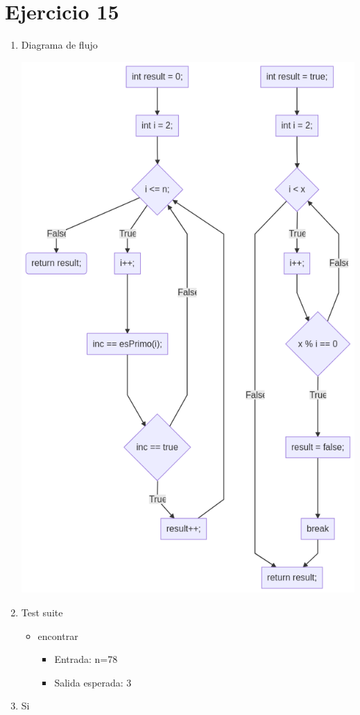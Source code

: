 \documentclass{article}
\begin{document}
\section*{Ejercicio 15}

\begin{enumerate}
    \item Diagrama de flujo
    
    \includegraphics[scale=0.65]{recursos/cantidadDePrimos.png}

    \item Test suite
        \begin{itemize}
            \item encontrar
                \begin{itemize}
                    \item Entrada: n=78
                    \item Salida esperada: 3
                \end{itemize}
        \end{itemize}
    \item Si
\end{enumerate}
\end{document}
